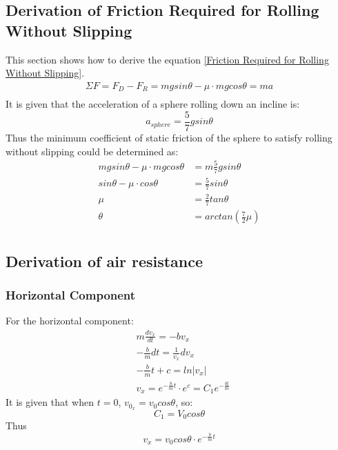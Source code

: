 \documentclass[conference]{IEEEtran}
\begin{document}
    \subsection{Derivation of Friction Required for Rolling Without Slipping} \label{deriviationofmu}
    This section shows how to derive the equation \ref{Friction Required for Rolling Without Slipping}.
    \begin{equation} 
    \begin{aligned} 
        \Sigma F = F_D - F_R = mgsin\theta - \mu\cdot mgcos\theta = ma\\
        \label{eq:user}
    \end{aligned}
\end{equation}
It is given that the acceleration of a sphere rolling down an incline is:
\begin{equation}
    a_{sphere} = \frac{5}{7}gsin\theta
\end{equation}
Thus the minimum coefficient of static friction of the sphere to satisfy rolling without slipping could be determined as:
\begin{equation}
    \begin{aligned}
        mgsin\theta - \mu \cdot mgcos\theta &= m\frac{5}{7}gsin\theta\\
        sin\theta - \mu\cdot cos\theta &= \frac{5}{7}sin\theta\\
        \mu &= \frac{2}{7}tan\theta\\
        \theta &= arctan(\frac{7}{2}\mu)\\
    \end{aligned}
\end{equation}

    \subsection{Derivation of air resistance}\label{derviair}
\subsubsection{Horizontal Component}
For the horizontal component:
\begin{equation}
    \begin{aligned}
        &m\frac{dv_x}{dt}= -bv_x\\
        &-\frac{b}{m}dt = \frac{1}{v_x}dv_x\\
        &-\frac{b}{m}t+c = ln |v_x|\\
        &v_x = e^{-\frac{b}{m}t}\cdot e^c = C_1e^{-\frac{bt}{m}}
    \end{aligned}
\end{equation}
It is given that when $t = 0$, $v_{0_x} = v_0cos\theta$, so:
$$C_1 = V_0cos\theta$$
Thus
\begin{equation} \label{x_air}
    v_x = v_0cos\theta \cdot e^{-\frac{b}{m}t}
\end{equation}
\end{document}
